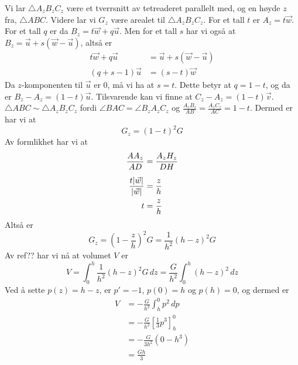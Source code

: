 Vi lar $\triangle A_zB_zC_z$ være et tverrsnitt av tetreaderet parallelt med, og en høyde $z$ fra, $\triangle ABC$. Videre lar vi $G_z$ være arealet til $\triangle A_zB_zC_z$. For et tall $t$ er $A_z=t\vec{w}$. For et tall $q$ er da $B_z=t\vec{w}+q\vec{u}$. Men for et tall $s$ har vi også at $B_z=\vec{u}+s(\vec{w}-\vec{u})$, altså er
\begin{align*}
	t\vec{w}+q\vec{u}&=\vec{u}+s(\vec{w}-\vec{u}) \\
	(q+s-1)\vec{u}&=(s-t)\vec{w}
\end{align*}
Da $z$-komponenten til $\vec{u}$ er 0, må vi ha at $s=t$. Dette betyr at $q=1-t$, og da er $B_z-A_z=(1-t)\vec{u}$. Tilsvarende kan vi finne at $C_z-A_z=(1-t)\vec{v}$. $\triangle ABC\sim \triangle A_zB_zC_z$ fordi $\angle BAC=\angle B_zA_zC_z$ og $\frac{A_zB_z}{AB}=\frac{A_zC_z}{AC}=1-t$. Dermed er har vi at
\[ G_z=(1-t)^2G \]
Av formlikhet har vi at
\begin{align}
	\frac{AA_z}{AD}&=\frac{A_zH_z}{DH}\br
	\frac{t|\vec{w}|}{|\vec{w}|}&=\frac{z}{h} \\
	t&=\frac{z}{h}
\end{align}
Altså er 
\[ G_z=\left(1-\frac{z}{h}\right)^2G=\frac{1}{h^2}(h-z)^2G \]
Av ref?? har vi nå at volumet $V$ er 
\[ V=\int_{0}^{h}\frac{1}{h^2}(h-z)^2G\,dz=\frac{G}{h^2}\int_{0}^{h}(h-z)^2\,dz\]
Ved å sette $p(z)=h-z$, er $p'=-1$, $p(0)=h$ og $p(h)=0$, og dermed er 
\begin{align*}
	V&=-\frac{G}{h^2}\int_{h}^{0}p^2\,dp \\
	&= -\frac{G}{h^2}\left[\frac{1}{3}p^3\right]_{h}^0 \\
	&= -\frac{G}{3h^2}\left(0-h^3\right) \\
	&=\frac{Gh}{3}
\end{align*}
